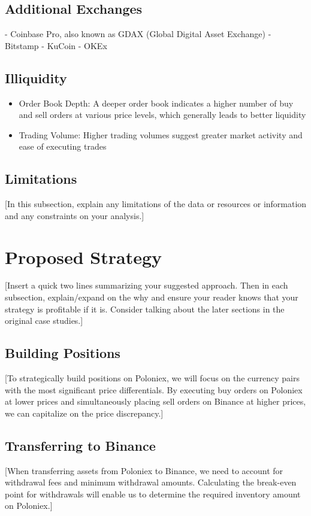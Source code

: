 \documentclass{article}
\begin{document}
\subsection{Additional Exchanges}
- Coinbase Pro, also known as GDAX (Global Digital Asset Exchange)
- Bitstamp
- KuCoin
- OKEx
\subsection{Illiquidity}
\begin{itemize}
  \item Order Book Depth: A deeper order book indicates a higher number of buy and sell orders at various price levels, which generally leads to better liquidity
  \item Trading Volume: Higher trading volumes suggest greater market activity and ease of executing trades
\end{itemize}
\subsection{Limitations}
[In this subsection, explain any limitations of the data or resources or information and any constraints on your analysis.]

\section{Proposed Strategy}
[Insert a quick two lines summarizing your suggested approach. Then in each subsection, explain/expand on the why and ensure your reader knows that your strategy is profitable if it is. Consider talking about the later sections in the original case studies.]
\subsection{Building Positions}
[To strategically build positions on Poloniex, we will focus on the currency pairs with the most significant price differentials. By executing buy orders on Poloniex at lower prices and simultaneously placing sell orders on Binance at higher prices, we can capitalize on the price discrepancy.]
\subsection{Transferring to Binance}
[When transferring assets from Poloniex to Binance, we need to account for withdrawal fees and minimum
withdrawal amounts. Calculating the break-even point for withdrawals will enable us to determine the
required inventory amount on Poloniex.]
\end{document}
